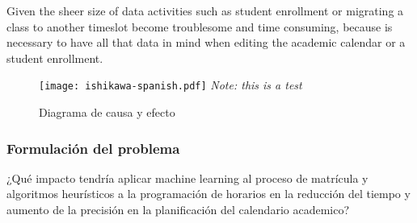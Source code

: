 Given the sheer size of data activities such as student enrollment or migrating a class to another timeslot become troublesome and time consuming, because is necessary to have all that data in mind when editing the academic calendar or a student enrollment.

\begin{figure}[H]
    \centering
    \caption{Diagrama de causa y efecto} \label{fig:ishikawa}
    \texttt{[image: ishikawa-spanish.pdf]}
    \textit{Note: this is a test}
\end{figure}

\subsubsection{Formulación del problema}
¿Qué impacto tendría aplicar machine learning al proceso de matrícula y algoritmos heurísticos a la programación de horarios en la reducción del tiempo y aumento de la precisión en la planificación del calendario academico?

